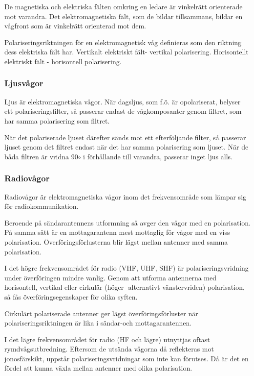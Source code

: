De magnetiska och elektriska fälten omkring en ledare är vinkelrätt orienterade mot
varandra. Det elektromagnetiska fält, som de bildar tillsammans, bildar en vågfront som är
vinkelrätt orienterad mot dem.

Polariseringsriktningen för en elektromagnetisk våg definieras som den riktning dess
elektriska fält har.
Vertikalt elektriskt fält- vertikal polarisering.
Horisontellt elektriskt fält - horisontell polarisering.

\subsubsection{Ljusvågor}

Ljus är elektromagnetiska vågor. När dagsljus, som f.ö. är opolariserat, belyser ett
polariseringsfilter, så passerar endast de vågkomposanter genom filtret, som har samma
polarisering som filtret.

När det polariserade ljuset därefter sänds mot ett efterföljande filter, så passerar ljuset
genom det filtret endast när det har samma polarisering som ljuset. När de båda filtren är
vridna 90\(\circ\) i förhållande till varandra, passerar inget ljus alls.

\subsubsection{Radiovågor}
Radiovågor är elektromagnetiska vågor inom
det frekvensområde som lämpar sig för radiokommunikation.

Beroende på sändarantennens utformning så avger den vågor med en polarisation. På samma
sätt är en mottagarantenn mest mottaglig för vågor med en viss polarisation.
Överföringsförlusterna blir lägst mellan antenner med samma polarisation.

I det högre frekvensområdet för radio (VHF, UHF, SHF) är polariseringsvridning under
överföringen mindre vanlig. Genom att utforma antennerna med horisontell, vertikal eller
cirkulär (höger- alternativt vänstervriden) polarisation, så fås överföringsegenskaper för
olika syften.

Cirkulärt polariserade antenner ger lägst överföringsförluster när polariseringsriktningen
är lika i sändar-och mottagarantennen.

I det lägre frekvensområdet för radio (HF och lägre) utnyttjas oftast rymdvågsutbredning.
Eftersom de utsända vågorna då reflekteras mot jonosfärskikt, uppstår
polariseringsvridningar som inte kan förutses. Då är det en fördel att kunna växla mellan
antenner med olika polarisation.

